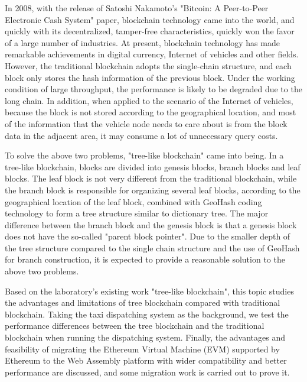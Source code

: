 \begin{abstractEn}
In 2008, with the release of Satoshi Nakamoto's "Bitcoin: A Peer-to-Peer Electronic Cash System" paper, blockchain technology came into the world, and quickly with its decentralized, tamper-free characteristics, quickly won the favor of a large number of industries. At present, blockchain technology has made remarkable achievements in digital currency, Internet of vehicles and other fields. However, the traditional blockchain adopts the single-chain structure, and each block only stores the hash information of the previous block. Under the working condition of large throughput, the performance is likely to be degraded due to the long chain. In addition, when applied to the scenario of the Internet of vehicles, because the block is not stored according to the geographical location, and most of the information that the vehicle node needs to care about is from the block data in the adjacent area, it may consume a lot of unnecessary query costs.

To solve the above two problems, "tree-like blockchain" came into being. In a tree-like blockchain, blocks are divided into genesis blocks, branch blocks and leaf blocks. The leaf block is not very different from the traditional blockchain, while the branch block is responsible for organizing several leaf blocks, according to the geographical location of the leaf block, combined with GeoHash coding technology to form a tree structure similar to dictionary tree. The major difference between the branch block and the genesis block is that a genesis block does not have the so-called "parent block pointer". Due to the smaller depth of the tree structure compared to the single chain structure and the use of GeoHash for branch construction, it is expected to provide a reasonable solution to the above two problems.

Based on the laboratory's existing work "tree-like blockchain", this topic studies the advantages and limitations of tree blockchain compared with traditional blockchain. Taking the taxi dispatching system as the background, we test the performance differences between the tree blockchain and the traditional blockchain when running the dispatching system. Finally, the advantages and feasibility of migrating the Ethereum Virtual Machine (EVM) supported by Ethereum to the Web Assembly platform with wider compatibility and better performance are discussed, and some migration work is carried out to prove it.

\end{abstractEn}
